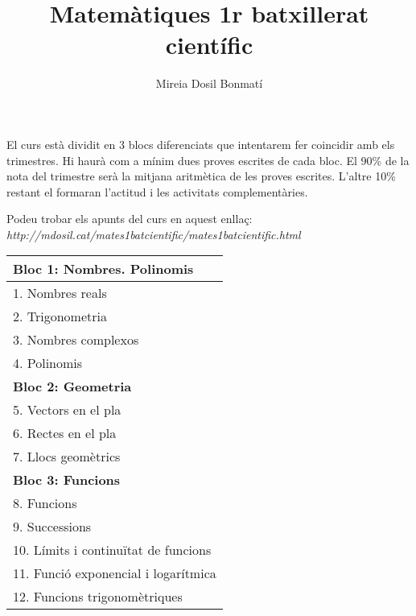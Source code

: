 \documentclass{article}
\title{Matemàtiques 1r batxillerat científic}
\author{Mireia Dosil Bonmatí}
\newlength{\rulelength}
\begin{document}
\thispagestyle{empty}
\setlength{\unitlength}{1in}

\makeatletter
\vspace*{3ex}
\par\noindent{\hspace*{-1.5em}\LARGE\bf \@title}
\vspace*{-1.2ex}
\par\noindent{{\hspace*{-1.5em}\rule{\rulelength}{1.05pt}}}
\vspace*{-.5ex}
\par\noindent{\hspace*{-1.5em}\large \@author}
\vspace*{5ex}
\makeatother

El curs està dividit en 3 blocs diferenciats que intentarem fer coincidir amb els trimestres. Hi haurà com a mínim dues proves escrites de cada bloc. El 90\% de la nota del trimestre serà la mitjana aritmètica de les proves escrites. L'altre 10\% restant el formaran l'actitud i les activitats complementàries.

Podeu trobar els apunts del curs en aquest enllaç: \emph{http://mdosil.cat/mates1batcientific/mates1batcientific.html}


\begin{center}
	\begin{tabular}{ | l |}
		\hline
		\textbf{Bloc 1: Nombres. Polinomis}   \\ 
		\hline
		1. Nombres reals \\
		2. Trigonometria\\
		3. Nombres complexos\\
		4. Polinomis\\
		\hline
		\hline
		\textbf{Bloc 2: Geometria}   \\ 
		\hline
		5. Vectors en el pla \\
		6. Rectes en el pla\\
		7. Llocs geomètrics\\
		\hline
		\hline
		\textbf{Bloc 3: Funcions}   \\ 
		\hline
		8. Funcions \\
		9. Successions\\
		10. Límits i continuïtat de funcions\\
		11. Funció exponencial i logarítmica\\
		12. Funcions trigonomètriques\\
		\hline
		
	\end{tabular}
\end{center}
\end{document}
